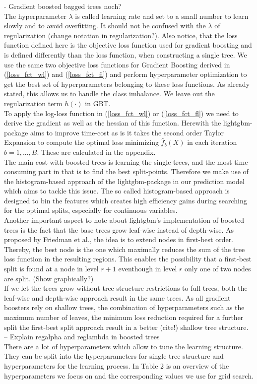 \documentclass[12pt,titlepage]{article}
\begin{document}
- Gradient boosted bagged trees noch? \\

The hyperparameter $\lambda$ is called learning rate and set to a small number to learn slowly and to avoid overfitting. It should not be confused with the $\lambda$ of regularization (change notation in regularization?). Also notice, that the loss function defined here is the objective loss function used for gradient boosting and is defined differently than the loss function, when constructing a single tree. We use the same two objective loss functions for Gradient Boosting derived in (\ref{loss_fct_wl}) and (\ref{loss_fct_fl}) and perform hyperparameter optimization to get the best set of hyperparameters belonging to these loss functions. As already stated, this allows us to handle the class imbalance. We leave out the regularization term $h(\cdot)$ in GBT.\\
To apply the log-loss function in (\ref{loss_fct_wl}) or (\ref{loss_fct_fl}) we need to derive the gradient as well as the hessian of this function. Herewith the lightgbm-package \cite{gbt} aims to improve time-cost as is it takes the second order Taylor Expansion to compute the optimal loss minimizing $\hat{f}_{b}(X)$ in each iteration $b=1,...,B$. These are calculated in the appendix. \\
The main cost with boosted trees is learning the single trees, and the most time-consuming part in that is to find the best split-points. Therefore we make use of the histogram-based approach of the lightgbm-package in our prediction model which aims to tackle this issue. The so called histogram-based approach is designed to bin the features which creates high efficiency gains during searching for the optimal splits, especially for continuous variables. \\
Another important aspect to note about lightgbm's implementation of boosted trees is the fact that the base trees grow leaf-wise instead of depth-wise. As proposed by Friedman et al., the idea is to extend nodes in first-best order. Thereby, the best node is the one which maximally reduces the sum of the tree loss function in the resulting regions. This enables the possibility that a first-best split is found at a node in level $r+1$ eventhough in level $r$ only one of two nodes are split. (Show graphically?) \\
If we let the trees grow without tree structure restrictions to full trees, both the leaf-wise and depth-wise approach result in the same trees. As all gradient boosters rely on shallow trees, the combination of hyperparameters such as the maximum number of leaves, the minimum loss reduction required for a further split the first-best split approach result in a better (cite!) shallow tree structure. \\
-- Explain regalpha and reglambda in boosted trees \\
There are a lot of hyperparameters which allow to tune the learning structure. They can be split into the hyperparameters for single tree structure and hyperparameters for the learning process. In Table 2 is an overview of the hyperparameters we focus on and the corresponding values we use for grid search. \\
\end{document}
